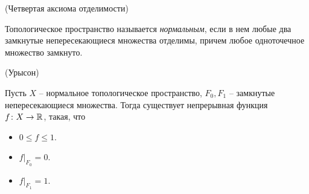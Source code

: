 \begin{definition}(Четвертая аксиома отделимости)
    
    Топологическое пространство называется \textit{нормальным},
    если в нем любые два замкнутые непересекающиеся множества
    отделимы, причем любое одноточечное множество замкнуто.
\end{definition}

\begin{lemma}(Урысон)
    
    Пусть $X$ -- нормальное топологическое пространство, 
    $F_0, F_1$ -- замкнутые непересекающиеся множества. Тогда
    существует непрерывная функция $f \colon X \to \mathbb{R}$, такая, что
    \begin{itemize}
        \item $0 \leqslant f \leqslant 1$.
        \item $f\big|_{F_0} = 0$.
        \item $f\big|_{F_1} = 1$.
    \end{itemize} 
\end{lemma}
